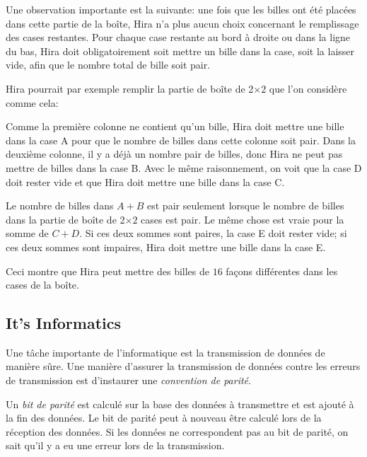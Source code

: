 \documentclass[a4paper,11pt]{report}
\newcommand{\taskGraphicsFolder}{..}
\begin{document}
Une observation importante est la suivante: une fois que les billes ont été placées dans cette partie de la boîte, Hira n’a plus aucun choix concernant le remplissage des cases restantes. Pour chaque case restante au bord à droite ou dans la ligne du bas, Hira doit obligatoirement soit mettre un bille dans la case, soit la laisser vide, afin que le nombre total de bille soit pair.

Hira pourrait par exemple remplir la partie de boîte de 2\ensuremath{\times}$2$ que l’on considère comme cela:

{\centering%
\par}

Comme la première colonne ne contient qu’un bille, Hira doit mettre une bille dans la case A pour que le nombre de billes dans cette colonne soit pair. Dans la deuxième colonne, il y a déjà un nombre pair de billes, donc Hira ne peut pas mettre de billes dans la case B. Avec le même raisonnement, on voit que la case D doit rester vide et que Hira doit mettre une bille dans la case C.

{\centering%
\par}

Le nombre de billes dans ${A + B}$ est pair seulement lorsque le nombre de billes dans la partie de boîte de 2\ensuremath{\times}$2$ cases est pair. Le même chose est vraie pour la somme de ${C + D}$. Si ces deux sommes sont paires, la case E doit rester vide; si ces deux sommes sont impaires, Hira doit mettre une bille dans la case E.

{\centering%
\par}

Ceci montre que Hira peut mettre des billes de $16$ façons différentes dans les cases de la boîte.


\subsection*{It’s Informatics}

Une tâche importante de l’informatique est la transmission de données de manière sûre. Une manière d’assurer la transmission de données contre les erreurs de transmission est d’instaurer une \emph{convention de parité}.

Un \emph{bit de parité} est calculé sur la base des données à transmettre et est ajouté à la fin des données. Le bit de parité peut à nouveau être calculé lors de la réception des données. Si les données ne correspondent pas au bit de parité, on sait qu’il y a eu une erreur lors de la transmission.
\end{document}
